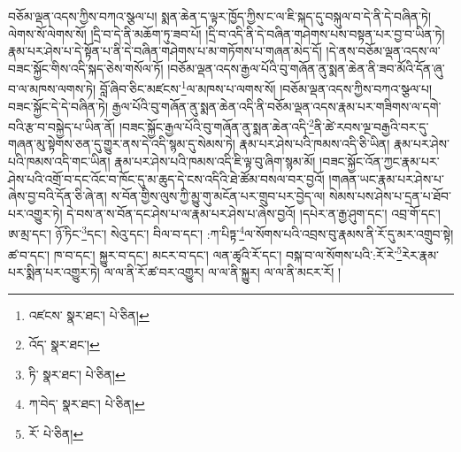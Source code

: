 བཅོམ་ལྡན་འདས་ཀྱིས་བཀའ་སྩལ་པ། སྨན་ཆེན་ད་ལྟར་ཁྱོད་ཀྱིས་ང་ལ་ཇི་སྐད་དུ་བསྐུལ་བ་དེ་ནི་དེ་བཞིན་ཏེ། ལེགས་སོ་ལེགས་སོ། །དྲི་བ་དེ་ནི་མཆོག་ཏུ་ཟབ་པོ། །དྲི་བ་འདི་ནི་དེ་བཞིན་གཤེགས་པས་བསྟན་པར་བྱ་བ་ཡིན་ཏེ། རྣམ་པར་ཤེས་པ་དེ་སྟོན་པ་ནི་དེ་བཞིན་གཤེགས་པ་མ་གཏོགས་པ་གཞན་མེད་དོ། །དེ་ནས་བཅོམ་ལྡན་འདས་ལ་བཟང་སྐྱོང་གིས་འདི་སྐད་ཅེས་གསོལ་ཏོ། །བཅོམ་ལྡན་འདས་རྒྱལ་པོའི་བུ་གཞོན་ནུ་སྨན་ཆེན་ནི་ཟབ་མོའི་དོན་ཞུ་བ་ལ་མཁས་ལགས་ཏེ། བློ་ཞིབ་ཅིང་མཛངས་\footnote{འཛངས་  སྣར་ཐང་།  པེ་ཅིན། }ལ་མཁས་པ་ལགས་སོ། །བཅོམ་ལྡན་འདས་ཀྱིས་བཀའ་སྩལ་པ། བཟང་སྐྱོང་དེ་དེ་བཞིན་ཏེ། རྒྱལ་པོའི་བུ་གཞོན་ནུ་སྨན་ཆེན་འདི་ནི་བཅོམ་ལྡན་འདས་རྣམ་པར་གཟིགས་ལ་དགེ་བའི་རྩ་བ་བསྐྱེད་པ་ཡིན་ནོ། །བཟང་སྐྱོང་རྒྱལ་པོའི་བུ་གཞོན་ནུ་སྨན་ཆེན་འདི་\footnote{འོད་  སྣར་ཐང་། }ནི་ཚེ་རབས་ལྔ་བརྒྱའི་བར་དུ་གཞན་མུ་སྟེགས་ཅན་དུ་གྱུར་ནས་དེ་འདི་སྙམ་དུ་སེམས་ཏེ། རྣམ་པར་ཤེས་པའི་ཁམས་འདི་ཅི་ཡིན། རྣམ་པར་ཤེས་པའི་ཁམས་འདི་གང་ཡིན། རྣམ་པར་ཤེས་པའི་ཁམས་འདི་ཇི་ལྟ་བུ་ཞིག་སྙམ་མོ། །བཟང་སྐྱོང་འོན་ཀྱང་རྣམ་པར་ཤེས་པའི་འགྲོ་བ་དང་འོང་བ་ཁོང་དུ་མ་ཆུད་དེ་ངས་འདིའི་ཐེ་ཚོམ་བསལ་བར་བྱའོ། །གཞན་ཡང་རྣམ་པར་ཤེས་པ་ཞེས་བྱ་བའི་དོན་ཅི་ཞེ་ན། ས་བོན་གྱིས་ལུས་ཀྱི་མྱུ་གུ་མངོན་པར་གྲུབ་པར་བྱེད་ལ། སེམས་པས་ཤེས་པ་དྲན་པ་ཐོབ་པར་འགྱུར་ཏེ། དེ་བས་ན་ས་བོན་དང་ཤེས་པ་ལ་རྣམ་པར་ཤེས་པ་ཞེས་བྱའོ། །དཔེར་ན་རྒྱ་ཤུག་དང་། འབྲ་གོ་དང་། ཨ་མྲ་དང་། ཉོ་ཏིང་\footnote{ཏི་  སྣར་ཐང་།  པེ་ཅིན། }དང་། སེའུ་དང་། བིལ་བ་དང་། :ཀ་པིཏྟ་\footnote{ཀ་བེད་  སྣར་ཐང་།  པེ་ཅིན། }ལ་སོགས་པའི་འབྲས་བུ་རྣམས་ནི་རོ་དུ་མར་འགྲུབ་སྟེ། ཚ་བ་དང་། ཁ་བ་དང་། སྐྱུར་བ་དང་། མངར་བ་དང་། ལན་ཚྭའི་རོ་དང་། བསྐ་བ་ལ་སོགས་པའི་:རོ་རེ་\footnote{རོ་  པེ་ཅིན། }རེར་རྣམ་པར་སྨིན་པར་འགྱུར་ཏེ། ལ་ལ་ནི་རོ་ཚ་བར་འགྱུར། ལ་ལ་ནི་སྐྱུར། ལ་ལ་ནི་མངར་རོ། །
